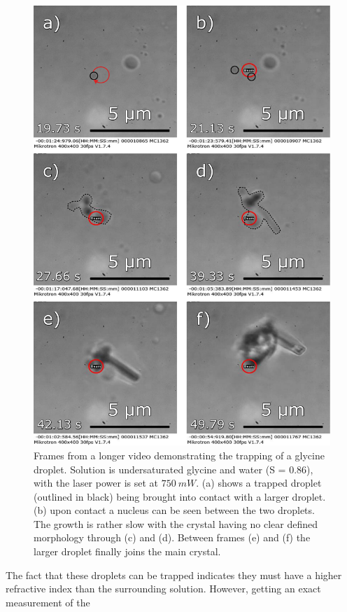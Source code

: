 \begin{figure}[h!]
	\centering
	\includegraphics[width=0.9\linewidth]{cluster_trapping.pdf}
	\caption{Frames from a longer video demonstrating the trapping of a glycine 
		droplet. Solution is undersaturated glycine and water (S = 0.86), with the 
		laser power is set at $750\ mW$. (a) shows a trapped droplet (outlined in 
		black) being brought into contact with a larger droplet. (b) upon contact 
		a nucleus can be seen between the two droplets. The growth is rather slow 
		with the crystal having no clear defined morphology through (c) and (d). 
		Between frames (e) and (f) the larger droplet finally joins the main crystal.}
	\label{fig:cluster_trapping}
\end{figure}

The fact that these droplets can be trapped indicates they must have a higher 
refractive index than the surrounding solution. However, getting an exact 
measurement of the 


